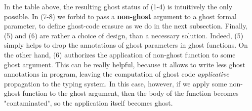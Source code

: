 \documentclass[a4paper,11pt,oneside]{article}
\theoremstyle{plain}
\begin{document}
In the table above, the resulting ghost status of (1-4) is intuitively the only possible.
In (7-8) we forbid to pass a \textbf{non-ghost} argument to a ghost formal parameter, to define ghost-code erasure as we do in the next subsection. 
Finally, (5) and (6) are rather a choice of design, than a necessary solution.
Indeed,  (5) simply helps to drop the annotations of ghost parameters in ghost functions. On the other hand, (6) authorizes the application of non-ghost function to some ghost argument. This can be really helpful, because it allows to write less ghost annotations in program, leaving the computation of ghost code \textit{applicative} propagation to the typing system. In this case, however, if we apply some non-ghost function to the ghost argument, then the body of the function becomes "contaminated", so the application itself becomes ghost.
\end{document}
